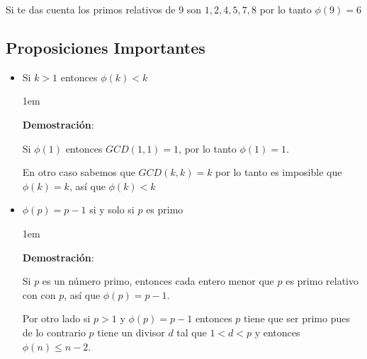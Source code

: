 \documentclass[12pt, fleqn]{report}                             %
\newenvironment{SmallIndentation}[1][0.75em]                    %
    {\begin{adjustwidth}{#1}{}\begin{footnotesize}}                 %
    {\end{footnotesize}\end{adjustwidth}}                           %
\begin{document}
            Si te das cuenta los primos relativos de 9 son $1,2,4,5,7,8$
            por lo tanto $\phi(9) = 6$








        \subsection{Proposiciones Importantes}

            \begin{itemize}

                \item Si $k > 1$ entonces $\phi(k) < k$
                
                    \begin{SmallIndentation}[1em]
                        \textbf{Demostración}:

                        Si $\phi(1)$ entonces $GCD(1,1) = 1$, por lo tanto
                        $\phi(1)=1$.

                        En otro caso sabemos que $GCD(k, k) = k$ por lo tanto
                        es imposible que $\phi(k)=k$, así que $\phi(k) < k$

                    \end{SmallIndentation}


                \item $\phi(p) = p - 1$ si y solo si $p$ es primo

                    \begin{SmallIndentation}[1em]
                        \textbf{Demostración}:

                        Si $p$ es un número primo, entonces cada entero menor
                        que $p$ es primo relativo con con $p$, así que 
                        $\phi(p) = p-1$.

                        Por otro lado si $p>1$ y $\phi(p) = p-1$ entonces $p$
                        tiene que ser primo pues de lo contrario $p$ tiene
                        un divisor $d$ tal que $1<d<p$ y entonces
                        $\phi(n) \leq n-2$.

                    \end{SmallIndentation}

            \end{itemize}
\end{document}
